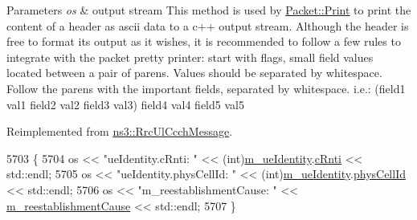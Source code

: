 \begin{DoxyParams}{Parameters}
{\em os} & output stream This method is used by \hyperlink{classns3_1_1Packet_aa34058a5cdbf94673531f8c4001ab227}{Packet\+::\+Print} to print the content of a header as ascii data to a c++ output stream. Although the header is free to format its output as it wishes, it is recommended to follow a few rules to integrate with the packet pretty printer\+: start with flags, small field values located between a pair of parens. Values should be separated by whitespace. Follow the parens with the important fields, separated by whitespace. i.\+e.\+: (field1 val1 field2 val2 field3 val3) field4 val4 field5 val5 \\
\hline
\end{DoxyParams}


Reimplemented from \hyperlink{classns3_1_1RrcUlCcchMessage_a6404899247d432e55fab61bf96bc4820}{ns3\+::\+Rrc\+Ul\+Ccch\+Message}.


\begin{DoxyCode}
5703 \{
5704   os << \textcolor{stringliteral}{"ueIdentity.cRnti: "} << (int)\hyperlink{classns3_1_1RrcConnectionReestablishmentRequestHeader_a35a87c6767d3bd47ef67688a98157bae}{m\_ueIdentity}.\hyperlink{structns3_1_1LteRrcSap_1_1ReestabUeIdentity_aa5bbd6336e92bf028cb8841e6669f9e6}{cRnti} << std::endl;
5705   os << \textcolor{stringliteral}{"ueIdentity.physCellId: "} << (\textcolor{keywordtype}{int})\hyperlink{classns3_1_1RrcConnectionReestablishmentRequestHeader_a35a87c6767d3bd47ef67688a98157bae}{m\_ueIdentity}.\hyperlink{structns3_1_1LteRrcSap_1_1ReestabUeIdentity_a90790c6986fc2f29df81220832eb4834}{physCellId} << std::endl;
5706   os << \textcolor{stringliteral}{"m\_reestablishmentCause: "} << \hyperlink{classns3_1_1RrcConnectionReestablishmentRequestHeader_a11c01646910bd88dcd441cde3532fd5a}{m\_reestablishmentCause} << std::endl;
5707 \}
\end{DoxyCode}
